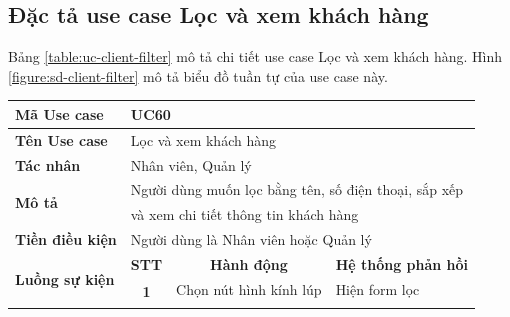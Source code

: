 \documentclass[../DoAn.tex]{subfiles}
\begin{document}
\subsection{Đặc tả use case Lọc và xem khách hàng}
\label{section:uc-client-filter}
Bảng \ref{table:uc-client-filter} mô tả chi tiết use case Lọc và xem khách hàng. Hình \ref{figure:sd-client-filter} mô tả biểu đồ tuần tự của use case này.
\begin{table}[H]
    \begin{tabular}{|l|c|l|l|}
        \hline
        \textbf{Mã Use case}                    & \multicolumn{3}{l|}{UC60}                                                                                                                                             \\ \hline
        \textbf{Tên Use case}                   & \multicolumn{3}{l|}{Lọc và xem khách hàng}                                                                                                                            \\ \hline
        \textbf{Tác nhân}                       & \multicolumn{3}{l|}{Nhân viên, Quản lý}                                                                                                                               \\ \hline
        \multirow{2}{*}{\textbf{Mô tả} }        & \multicolumn{3}{l|}{Người dùng muốn lọc bằng tên, số điện thoại, sắp xếp}                                                                                             \\
                                                & \multicolumn{3}{l|}{và xem chi tiết thông tin khách hàng}                                                                                                             \\ \hline
        \textbf{Tiền điều kiện}                 & \multicolumn{3}{l|}{Người dùng là Nhân viên hoặc Quản lý}                                                                                                             \\ \hline
        \multirow{7}{*}{\textbf{Luồng sự kiện}} & \multicolumn{1}{c|}{\textbf{STT}}                                         & \multicolumn{1}{c|}{\textbf{Hành động}} & \multicolumn{1}{c|}{\textbf{Hệ thống phản hồi}} \\ \cline{2-4}
                                                & \multirow{4}{*}{\textbf{1}}                                               & Chọn nút hình kính lúp                  & Hiện form lọc                                   \\ \cline{3-4}

\end{tabular}
\end{table}
\end{document}
